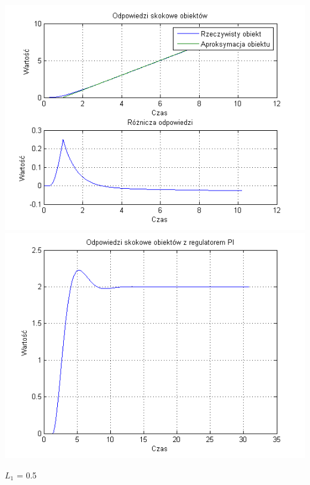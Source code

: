 \documentclass[10pt,a4paper]{article}
\begin{document}
\begin{center}
\includegraphics[scale=1]{images/jeden/skrypt_143.png}\\
\includegraphics[scale=1]{images/jeden/skrypt_144.png}\\
\end{center}
\newpage
$L_1$ = 0.5
\end{document}
